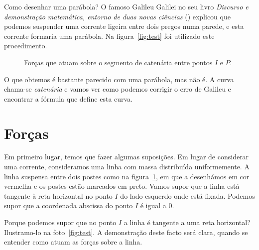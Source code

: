 
\cappar  Como desenhar uma parábola? O famoso Galileu Galilei no seu
livro \emph{Discurso e demonstração matemática, entorno de duas novas
  ciências} (\cite{Gal14}) explicou que podemos suspender uma corrente
ligeira entre dois pregos numa parede, e esta corrente formaria uma
parábola. Na figura~\ref{fig:test} foi utilizado este procedimento.

\begin{figure}
      \vspace{-10pt}
  \begin{figurebox}
      \centering
  \scalebox{0.35}{\Large {}}
  \caption{Forças que atuam sobre o segmento de catenária entre pontos $I$ e $P$.}
    \label{fig:1}
  \end{figurebox}
      \vspace{-40pt}
\end{figure}
\vspace{0.5cm}
O que obtemos é bastante parecido com uma parábola, mas não é. A
curva chama-se \emph{catenária} e vamos ver como podemos corrigir o
erro de Galileu e encontrar a fórmula que define esta curva.

\section{Forças}
Em primeiro lugar, temos que fazer algumas suposições. Em lugar de considerar
uma corrente, consideramos uma linha com massa distribuída uniformemente. A
linha suspensa entre dois postes como na figura~\ref{fig:1}, em que
a desenhámos em cor vermelha e os postes estão marcados em
preto. Vamos supor que a linha está tangente à reta horizontal no
ponto $I$ do lado esquerdo onde está fixada. Podemos supor que
a coordenada abscissa do ponto $I$ é igual a $0.$




Porque podemos supor que no ponto $I$ a linha é tangente a uma
reta horizontal? Ilustramo-lo na foto~\ref{fig:test}. A
demonstração deste facto será clara, quando se entender como atuam
as forças sobre a linha.

